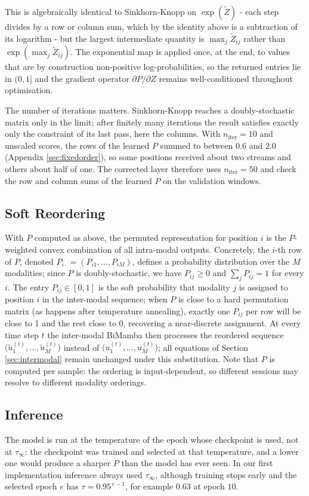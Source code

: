 \documentclass[10pt,a4paper,twocolumn]{article}
\begin{document}
	This is algebraically identical to Sinkhorn-Knopp on $\exp(\tilde{Z})$ - each step divides by a row or column sum, which by the identity above is a subtraction of its logarithm - but the largest intermediate quantity is $\max_j \tilde{Z}_{ij}$ rather than $\exp(\max_j \tilde{Z}_{ij})$. The exponential map is applied once, at the end, to values that are by construction non-positive log-probabilities, so the returned entries lie in $(0,1]$ and the gradient operator $\partial P / \partial Z$ remains well-conditioned throughout optimisation.

	The number of iterations matters. Sinkhorn-Knopp reaches a doubly-stochastic matrix only in the limit; after finitely many iterations the result satisfies exactly only the constraint of its last pass, here the columns. With $n_{\text{iter}} = 10$ and unscaled scores, the rows of the learned $P$ summed to between $0.6$ and $2.0$ (Appendix \ref{sec:fixedorder}), so some positions received about two streams and others about half of one. The corrected layer therefore uses $n_{\text{iter}} = 50$ and check the row and column sums of the learned $P$ on the validation windows.

	\subsection*{Soft Reordering}
	With $P$ computed as above, the permuted representation for position $i$ is the $P$-weighted convex combination of all intra-modal outputs. Concretely, the $i$-th row of $P$, denoted $P_{i\cdot} = (P_{i1}, \dots, P_{iM})$, defines a probability distribution over the $M$ modalities; since $P$ is doubly-stochastic, we have $P_{ij} \geq 0$ and $\sum_j P_{ij} = 1$ for every $i$. The entry $P_{ij} \in [0,1]$ is the soft probability that modality $j$ is assigned to position $i$ in the inter-modal sequence; when $P$ is close to a hard permutation matrix (as happens after temperature annealing), exactly one $P_{ij}$ per row will be close to 1 and the rest close to 0, recovering a near-discrete assignment. At every time step $t$ the inter-modal BiMamba then processes the reordered sequence $\bigl(\tilde{u}_1^{(t)}, \dots, \tilde{u}_M^{(t)}\bigr)$ instead of $\bigl(u_1^{(t)}, \dots, u_M^{(t)}\bigr)$; all equations of Section \ref{sec:intermodal} remain unchanged under this substitution. Note that $P$ is computed per sample: the ordering is input-dependent, so different sessions may resolve to different modality orderings.
	
	\subsection*{Inference}
	The model is run at the temperature of the epoch whose checkpoint is used, not at $\tau_\infty$: the checkpoint was trained and selected at that temperature, and a lower one would produce a sharper $P$ than the model has ever seen. In our first implementation inference always used $\tau_\infty$, although training stops early and the selected epoch $e$ has $\tau = 0.95^{\,e-1}$, for example $0.63$ at epoch $10$.
	
\end{document}
